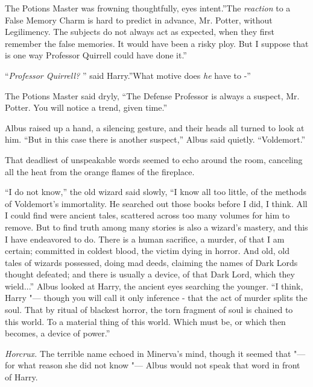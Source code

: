 The Potions Master was frowning thoughtfully, eyes intent.''The
\emph{reaction} to a False Memory Charm is hard to predict in advance,
Mr. Potter, without Legilimency. The subjects do not always act as
expected, when they first remember the false memories. It would have
been a risky ploy. But I suppose that is one way Professor Quirrell
could have done it.''

``\emph{Professor Quirrell?} '' said Harry.''What motive does \emph{he}
have to -''

The Potions Master said dryly, ``The Defense Professor is always a
suspect, Mr. Potter. You will notice a trend, given time.''

Albus raised up a hand, a silencing gesture, and their heads all turned
to look at him. ``But in this case there is another suspect,'' Albus
said quietly. ``Voldemort.''

That deadliest of unspeakable words seemed to echo around the room,
canceling all the heat from the orange flames of the fireplace.

``I do not know,'' the old wizard said slowly, ``I know all too little,
of the methods of Voldemort's immortality. He searched out those books
before I did, I think. All I could find were ancient tales, scattered
across too many volumes for him to remove. But to find truth among many
stories is also a wizard's mastery, and this I have endeavored to do.
There is a human sacrifice, a murder, of that I am certain; committed in
coldest blood, the victim dying in horror. And old, old tales of wizards
possessed, doing mad deeds, claiming the names of Dark Lords thought
defeated; and there is usually a device, of that Dark Lord, which they
wield...'' Albus looked at Harry, the ancient eyes searching the
younger. ``I think, Harry "--- though you will call it only inference -
that the act of murder splits the soul. That by ritual of blackest
horror, the torn fragment of soul is chained to this world. To a
material thing of this world. Which must be, or which then becomes, a
device of power.''

\emph{Horcrux.} The terrible name echoed in Minerva's mind, though it
seemed that "--- for what reason she did not know "--- Albus would not speak
that word in front of Harry.

